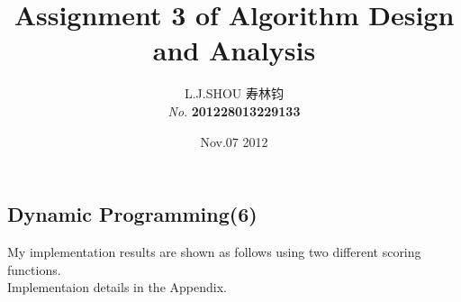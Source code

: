 \documentclass[11pt]{article}
\begin{document}
\begin{CJK}{UTF8}{gkai}
\title{ \textbf{Assignment 3 of Algorithm Design and Analysis}}
\author{L.J.SHOU  寿林钧\\{\slshape No}. \bf 201228013229133}
\date{Nov.07 2012}
\maketitle %
\section{Dynamic Programming(6)}
My implementation results are shown as follows using two different scoring functions.  \\
{\tiny Implementaion details in the Appendix.}\\


\end{CJK}
\end{document}
